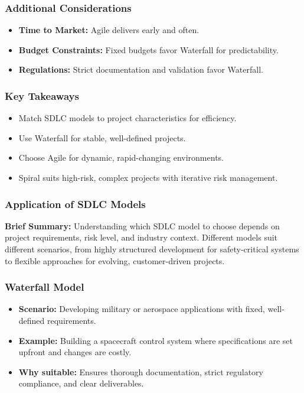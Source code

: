 \documentclass{beamer}
\begin{document}
\begin{frame}[fragile]
  \frametitle{Additional Considerations}
  \begin{itemize}
    \item \textbf{Time to Market:} Agile delivers early and often. \\
    \item \textbf{Budget Constraints:} Fixed budgets favor Waterfall for predictability. \\
    \item \textbf{Regulations:} Strict documentation and validation favor Waterfall.
  \end{itemize}
\end{frame}

\begin{frame}[fragile]
  \frametitle{Key Takeaways}
  \begin{itemize}
    \item Match SDLC models to project characteristics for efficiency. \\
    \item Use Waterfall for stable, well-defined projects. \\
    \item Choose Agile for dynamic, rapid-changing environments. \\
    \item Spiral suits high-risk, complex projects with iterative risk management.
  \end{itemize}
\end{frame}

\begin{frame}[fragile]
  \frametitle{Application of SDLC Models}
  \textbf{Brief Summary:} Understanding which SDLC model to choose depends on project requirements, risk level, and industry context. Different models suit different scenarios, from highly structured development for safety-critical systems to flexible approaches for evolving, customer-driven projects.
\end{frame}

\begin{frame}[fragile]
  \frametitle{Waterfall Model}
  \begin{itemize}
    \item \textbf{Scenario:} Developing military or aerospace applications with fixed, well-defined requirements.
    \item \textbf{Example:} Building a spacecraft control system where specifications are set upfront and changes are costly.
    \item \textbf{Why suitable:} Ensures thorough documentation, strict regulatory compliance, and clear deliverables.
  \end{itemize}
\end{frame}
\end{document}
